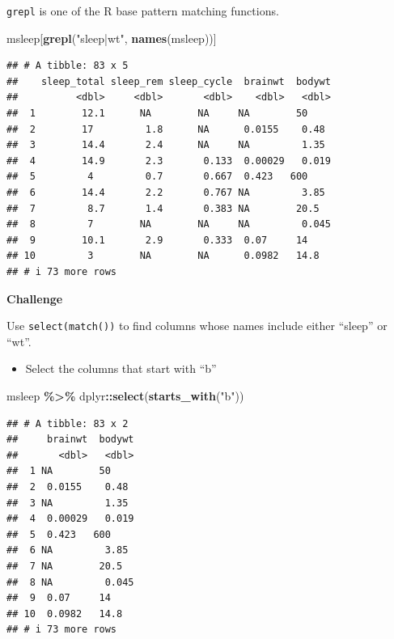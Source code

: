 \documentclass[
]{book}
\newenvironment{Shaded}{\begin{snugshade}}{\end{snugshade}}
\newcommand{\FunctionTok}[1]{\textcolor[rgb]{0.13,0.29,0.53}{\textbf{#1}}}
\newcommand{\NormalTok}[1]{#1}
\newcommand{\SpecialCharTok}[1]{\textcolor[rgb]{0.81,0.36,0.00}{\textbf{#1}}}
\newcommand{\StringTok}[1]{\textcolor[rgb]{0.31,0.60,0.02}{#1}}
\providecommand{\tightlist}{%
  \setlength{\itemsep}{0pt}\setlength{\parskip}{0pt}}
\begin{document}
\texttt{grepl} is one of the R base pattern matching functions.

\begin{Shaded}
\begin{Highlighting}[]
\NormalTok{msleep[}\FunctionTok{grepl}\NormalTok{(}\StringTok{"sleep|wt"}\NormalTok{, }\FunctionTok{names}\NormalTok{(msleep))]}
\end{Highlighting}
\end{Shaded}

\begin{verbatim}
## # A tibble: 83 x 5
##    sleep_total sleep_rem sleep_cycle  brainwt  bodywt
##          <dbl>     <dbl>       <dbl>    <dbl>   <dbl>
##  1        12.1      NA        NA     NA        50    
##  2        17         1.8      NA      0.0155    0.48 
##  3        14.4       2.4      NA     NA         1.35 
##  4        14.9       2.3       0.133  0.00029   0.019
##  5         4         0.7       0.667  0.423   600    
##  6        14.4       2.2       0.767 NA         3.85 
##  7         8.7       1.4       0.383 NA        20.5  
##  8         7        NA        NA     NA         0.045
##  9        10.1       2.9       0.333  0.07     14    
## 10         3        NA        NA      0.0982   14.8  
## # i 73 more rows
\end{verbatim}

\textbf{Challenge}

Use \texttt{select(match())} to find columns whose names include either ``sleep'' or ``wt''.

\begin{itemize}
\tightlist
\item
  Select the columns that start with ``b''
\end{itemize}

\begin{Shaded}
\begin{Highlighting}[]
\NormalTok{msleep }\SpecialCharTok{\%\textgreater{}\%}
\NormalTok{  dplyr}\SpecialCharTok{::}\FunctionTok{select}\NormalTok{(}\FunctionTok{starts\_with}\NormalTok{(}\StringTok{"b"}\NormalTok{))}
\end{Highlighting}
\end{Shaded}

\begin{verbatim}
## # A tibble: 83 x 2
##     brainwt  bodywt
##       <dbl>   <dbl>
##  1 NA        50    
##  2  0.0155    0.48 
##  3 NA         1.35 
##  4  0.00029   0.019
##  5  0.423   600    
##  6 NA         3.85 
##  7 NA        20.5  
##  8 NA         0.045
##  9  0.07     14    
## 10  0.0982   14.8  
## # i 73 more rows
\end{verbatim}
\end{document}
